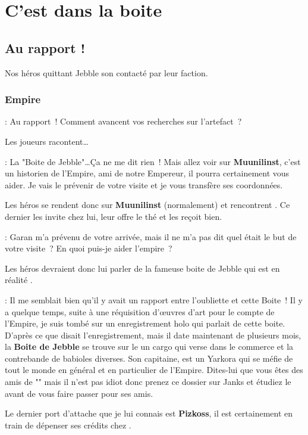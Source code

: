 \section{C’est dans la boite}


\subsection{Au rapport !}
Nos héros quittant Jebble son contacté par leur faction.

\subsubsection{Empire}
\begin{quotebox}
    : Au rapport~! Comment avancent vos recherches sur l’artefact~?
\end{quotebox}
Les joueurs racontent\ldots
\begin{quotebox}
    : La "Boite de Jebble"\ldots Ça ne me dit rien~! Mais allez voir  sur \textbf{Muunilinst}, c’est un historien de l’Empire, ami de notre Empereur, il pourra certainement vous aider. Je vais le prévenir de votre visite et je vous transfère ses coordonnées.
\end{quotebox}

Les héros se rendent donc sur \textbf{Muunilinst} (normalement) et rencontrent . Ce dernier les invite chez lui, leur offre le thé et les reçoit bien.
\begin{quotebox}
    : Garan m’a prévenu de votre arrivée, mais il ne m’a pas dit quel était le but de votre visite~? En quoi puis-je aider l’empire~?
\end{quotebox}
Les héros devraient donc lui parler de la fameuse boite de Jebble qui est en réalité .

\begin{quotebox}
    : Il me semblait bien qu’il y avait un rapport entre l’oubliette et cette Boite~! Il y a quelque temps, suite à une réquisition d’\oe{uvres} d’art pour le compte de l’Empire, je suis tombé sur un enregistrement holo qui parlait de cette boite. D’après ce que disait l’enregistrement, mais il date maintenant de plusieurs mois, la \textbf{Boite de Jebble} se trouve sur le  un cargo qui verse dans le commerce et la contrebande de babioles diverses. Son capitaine,  est un Yarkora qui se méfie de tout le monde en général et en particulier de l’Empire. Dites-lui que vous êtes des amis de "\textbf{}" mais il n’est pas idiot donc prenez ce dossier sur Janks et étudiez le avant de vous faire passer pour ses amis.

    Le dernier port d’attache que je lui connais est \textbf{Pizkoss}, il est certainement en train de dépenser ses crédits chez .
\end{quotebox}

